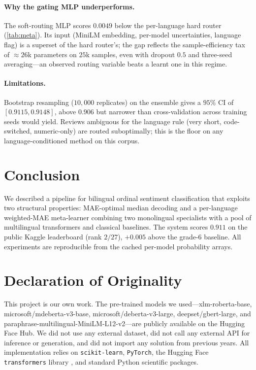 \documentclass{article}
\theoremstyle{plain}
\begin{document}
\paragraph{Why the gating MLP underperforms.}
The soft-routing MLP scores $0.0049$ below the per-language hard
router (\cref{tab:meta}). Its input (MiniLM embedding, per-model
uncertainties, language flag) is a superset of the hard router's; the
gap reflects the sample-efficiency tax of $\approx 26$k parameters on
$25$k samples, even with dropout $0.5$ and three-seed averaging---an
observed routing variable beats a learnt one in this regime.

\paragraph{Limitations.}
Bootstrap resampling ($10{,}000$ replicates) on the ensemble gives a
$95\%$ CI of $[0.9115,0.9148]$, above $0.906$ but narrower than
cross-validation across training seeds would yield. Reviews ambiguous
for the language rule (very short, code-switched, numeric-only) are
routed suboptimally; this is the floor on any
language-conditioned method on this corpus.

\section{Conclusion}

We described a pipeline for bilingual ordinal sentiment classification
that exploits two structural properties: MAE-optimal median decoding
and a per-language weighted-MAE meta-learner combining two monolingual
specialists with a pool of multilingual transformers and classical
baselines. The system scores $0.911$ on the public Kaggle leaderboard
(rank $2/27$), $+0.005$ above the grade-6 baseline. All experiments
are reproducible from the cached per-model probability arrays.

\section*{Declaration of Originality}

This project is our own work. The pre-trained models we
used---xlm-roberta-base, microsoft/mdeberta-v3-base,
microsoft/deberta-v3-large, deepset/gbert-large, and
paraphrase-multilingual-MiniLM-L12-v2---are publicly available on the
Hugging Face Hub. We did not use any external dataset, did not call any
external API for inference or generation, and did not import any
solution from previous years. All implementation relies on
\texttt{scikit-learn}, \texttt{PyTorch}, the Hugging Face
\texttt{transformers} library \cite{wolf2020transformers}, and standard
Python scientific packages.



\end{document}
